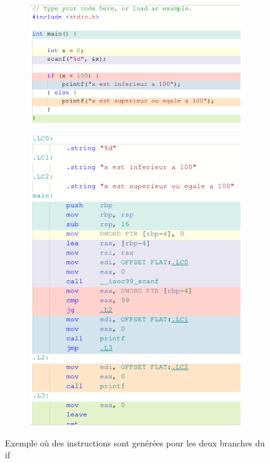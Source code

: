 \documentclass[11pt]{article} %
\begin{document}
\begin{figure}[h!]
    \centering
    \begin{subfigure}[h!]{0.4\textwidth}
        \includegraphics[width=\linewidth]{media/nodfce-left.png}
    \end{subfigure}
    \begin{subfigure}[h!]{0.4\textwidth}
        \includegraphics[width=\linewidth]{media/nodce-right.png}
    \end{subfigure}
    \caption{Exemple o\`u des instructions sont gen\'er\'ees pour les deux branches du if}
\end{figure}
\end{document}
